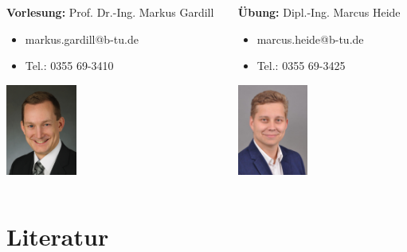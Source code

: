 \begin{frame}
    \begin{columns}[onlytextwidth]
        \begin{column}{0.5\textwidth}
            \textbf{Vorlesung:} Prof. Dr.-Ing. Markus Gardill
            \begin{itemize}
                \item markus.gardill@b-tu.de
                \item Tel.: 0355 69-3410
            \end{itemize}
            \begin{center}
                \includegraphics[height=3cm]{fig/photo_gardill}
            \end{center}
        \end{column}
        \begin{column}{0.5\textwidth}
            \textbf{Übung:} Dipl.-Ing. Marcus Heide
            \begin{itemize}
                \item marcus.heide@b-tu.de
                \item Tel.: 0355 69-3425
            \end{itemize}
            \begin{center}
                \includegraphics[height=3cm]{fig/photo_heide}
            \end{center}
        \end{column}
    \end{columns}

\end{frame}


\section{Literatur}

